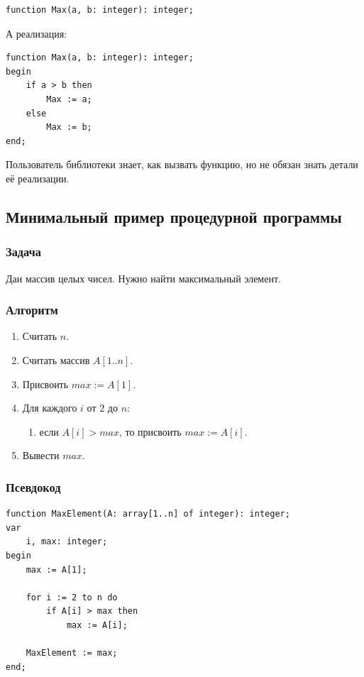 \documentclass[12pt,a4paper]{article}
\begin{document}
\begin{verbatim}
function Max(a, b: integer): integer;
\end{verbatim}

А реализация:

\begin{verbatim}
function Max(a, b: integer): integer;
begin
    if a > b then
        Max := a;
    else
        Max := b;
end;
\end{verbatim}

Пользователь библиотеки знает, как вызвать функцию, но не обязан знать детали её реализации.

\subsection{Минимальный пример процедурной программы}

\subsubsection{Задача}

Дан массив целых чисел. Нужно найти максимальный элемент.

\subsubsection{Алгоритм}

\begin{enumerate}
    \item Считать $n$.
    \item Считать массив $A[1..n]$.
    \item Присвоить $max := A[1]$.
    \item Для каждого $i$ от $2$ до $n$:
    \begin{enumerate}
        \item если $A[i] > max$, то присвоить $max := A[i]$.
    \end{enumerate}
    \item Вывести $max$.
\end{enumerate}

\subsubsection{Псевдокод}

\begin{verbatim}
function MaxElement(A: array[1..n] of integer): integer;
var
    i, max: integer;
begin
    max := A[1];

    for i := 2 to n do
        if A[i] > max then
            max := A[i];

    MaxElement := max;
end;
\end{verbatim}
\end{document}
